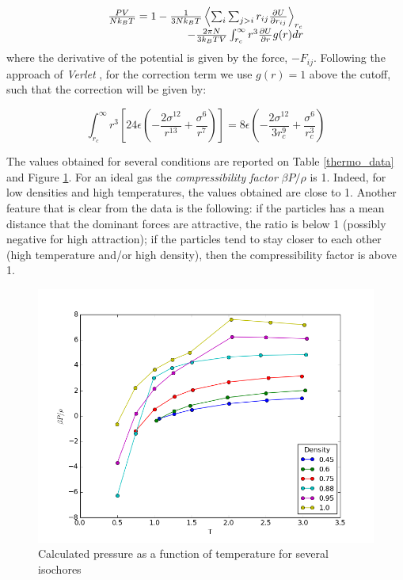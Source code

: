 \documentclass[aps,prl,reprint,groupedaddress]{revtex4-1}
\begin{document}
\begin{equation}
\begin{array}{r r}
  \frac{PV}{N k_B T} = 1 - \frac{1}{3Nk_BT}\left\langle \sum_i \sum_{j>i} r_{ij} \frac{\partial U}{\partial r_{ij}} \right\rangle_{r_c} \\
   - \frac{2\pi N}{3k_BTV}\int_{r_c}^{\infty} r^3 \frac{\partial U}{\partial r} g(r) dr
\end{array}
\end{equation}
where the derivative of the potential is given by the force, $-F_{ij}$. Following the approach of \textit{Verlet} \cite{Verlet1967}, for the correction term we use $g(r) = 1$ above the cutoff, such that the correction will be given by:

\begin{equation}
  \int_{r_c}^{\infty} r^3 \left[ 24 \epsilon \left( -\frac{2 \sigma^{12}}{r^{13}} + \frac{\sigma^6}{r^7} \right) \right] = 8 \epsilon \left( -\frac{2 \sigma^{12}}{3r_c^{9}} + \frac{\sigma^6}{r_c^3} \right)
\end{equation}

The values obtained for several conditions are reported on Table \ref{thermo_data} and Figure \ref{press_graph}. For an ideal gas the \textit{compressibility factor} $\beta P/\rho$ is 1. Indeed, for low densities and high temperatures, the values obtained are close to 1. Another feature that is clear from the data is the following: if the particles has a mean distance that the dominant forces are attractive, the ratio is below 1 (possibly negative for high attraction); if the particles tend to stay closer to each other (high temperature and/or high density), then the compressibility factor is above 1.

\begin{figure}[ht]
	\includegraphics[scale=0.4]{pressure.png}
	\caption{Calculated pressure as a function of temperature for  several isochores\label{press_graph}}
\end{figure}
\end{document}
